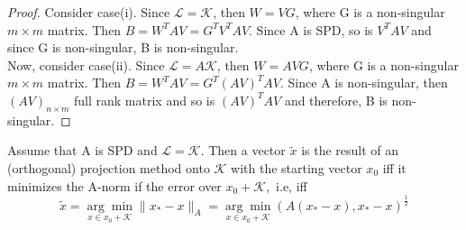 \documentclass[10pt,a4paper]{article}
\begin{document}
\begin{proof}
Consider case(i). Since $\mathcal{L}=\mathcal{K}$, then $W=VG$, where G is a non-singular $m\times m$ matrix. Then $B=W^TAV={G^T}V^TAV$. Since A is SPD, so is $V^TAV$ and since G is non-singular, B is non-singular. \\
Now, consider case(ii). Since $\mathcal{L}=A\mathcal{K}$, then $W=AVG$, where G is a non-singular $m\times m$ matrix. Then $B=W^TAV={G^T}(AV)^TAV$. Since A is non-singular, then $(AV)_{n\times m }$ full rank matrix and so is $(AV)^TAV$ and therefore, B is non-singular.
\end{proof}

\begin{theorem}
Assume that A is SPD and $\mathcal{L}=\mathcal{K}.$ Then a vector $\tilde{x}$ is the result of an (orthogonal) projection method onto $\mathcal{K}$ with the  starting vector $x_0$ iff it minimizes the A-norm if the error over $x_0+\mathcal{K},$ i.e, iff
$$\tilde{x} = \underset{x\in x_0+\mathcal{K}}{\arg\min}\|x_*-x\|_A=\underset{x\in x_0+\mathcal{K}}{\arg\min}(A(x_*-x),x_*-x)^{\frac{1}{2}}$$
\end{theorem}
\end{document}
